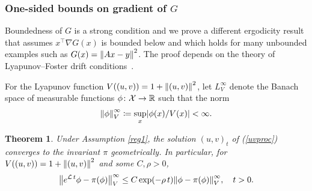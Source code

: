 \documentclass[11pt, twoside]{report}
\newtheorem{theorem}{Theorem}[section]
\begin{document}
\subsubsection{One-sided bounds on gradient of \texorpdfstring{$G$}{G}}
Boundedness of $G$ is a strong condition and we prove a different ergodicity result that assumes $x^\top \nabla G(x)$ is bounded below and which holds for many unbounded examples such as $G(x)=\left\lVert Ax-y\right\rVert^2$.
The proof depends on the theory of Lyapunov--Foster drift conditions~\cite{Meyn2012-oq,Hairer2011-of,Lelievre2016-hx}. 

For the Lyapunov function $V((u,v))=1+\left\lVert(u,v)\right\rVert^2$, let $L^\infty_V$ denote the Banach space  of  measurable functions $\phi\colon \mathcal X\to\mathbb{R}$ such that the norm $$\norm{\phi}^\infty_
V\coloneq\sup_x \abs{\phi(x)/V(x)}<\infty.$$
\begin{theorem} \label{erg2} Under Assumption \ref{reg1}, the solution $(u,v)_t$ of (\ref{uvproc}) converges to the invariant $\pi$ geometrically. In particular, for $V((u,v))=1+\left\lVert(u,v)\right\rVert^2$ and some $C,\rho>0$,
    \[\norm{e^{\mathcal L\, t}\phi   - \pi(\phi)}^\infty_V\le  C \exp(-\rho\, t) \norm{\phi-\pi(\phi)}^\infty_V,\quad t>0.
    \]
\end{theorem}
%
\end{document}
